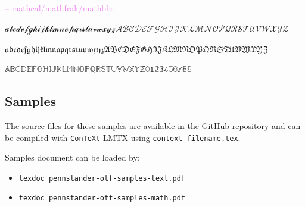 \documentclass[a4paper]{scrartcl}
\newcommand{\abc}{abcdefghijklmnopqrstuvwxyz}
\newcommand{\ABC}{ABCDEFGHIJKLMNOPQRSTUVWXYZ}
\newcommand{\samplenumbers}{0123456789}
\begin{document}
\smallskip

\textcolor{violet}{-- mathcal/mathfrak/mathbb:}

$\mathcal{\abc\ABC}$

$\mathfrak{\abc\ABC}$

$\mathbb{\ABC\samplenumbers}$

\subsection{Samples}

The source files for these samples are available in the \href{github.com/juliusross1}{GitHub} repository and can be compiled with \texttt{ConTeXt} LMTX using \texttt{context filename.tex}.

\smallskip

Samples document can be loaded by:

\begin{itemize}
  \item \texttt{texdoc pennstander-otf-samples-text.pdf}
  \item \texttt{texdoc pennstander-otf-samples-math.pdf}
\end{itemize}
\end{document}
